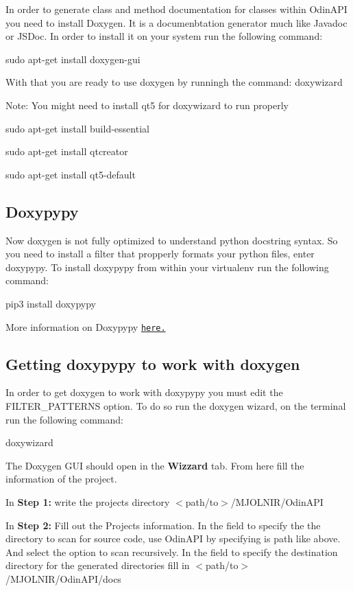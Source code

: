 In order to generate class and method documentation for classes within Odin\+A\+PI you need to install Doxygen. It is a documenbtation generator much like Javadoc or J\+S\+Doc. In order to install it on your system run the following command\+: 
\begin{DoxyCode}
sudo apt-get install doxygen-gui
\end{DoxyCode}
 With that you are ready to use doxygen by runningh the command\+: {\ttfamily doxywizard}

Note\+: You might need to install qt5 for doxywizard to run properly 
\begin{DoxyCode}
sudo apt-get install build-essential

sudo apt-get install qtcreator

sudo apt-get install qt5-default
\end{DoxyCode}
 \subsection*{Doxypypy}

Now doxygen is not fully optimized to understand python docstring syntax. So you need to install a filter that propperly formats your python files, enter doxypypy. To install doxypypy from within your virtualenv run the following command\+: 
\begin{DoxyCode}
pip3 install doxypypy
\end{DoxyCode}
 More information on Doxypypy \href{!https://github.com/Feneric/doxypypy}{\tt here.}

\subsection*{Getting doxypypy to work with doxygen}

In order to get doxygen to work with doxypypy you must edit the {\ttfamily F\+I\+L\+T\+E\+R\+\_\+\+P\+A\+T\+T\+E\+R\+NS} option. To do so run the doxygen wizard, on the terminal run the following command\+: 
\begin{DoxyCode}
doxywizard
\end{DoxyCode}
 The Doxygen G\+UI should open in the {\bfseries Wizzard} tab. From here fill the information of the project.

In {\bfseries Step 1\+:} write the project\textquotesingle{}s directory {\ttfamily $<$path/to$>$/\+M\+J\+O\+L\+N\+I\+R/\+Odin\+A\+PI}

In {\bfseries Step 2\+:} Fill out the Projects information. In the field to specify the the directory to scan for source code, use Odin\+A\+PI by specifying is path like above. And select the option to scan recursively. In the field to specify the destination directory for the generated directories fill in {\ttfamily $<$path/to$>$/\+M\+J\+O\+L\+N\+I\+R/\+Odin\+A\+P\+I/docs}

